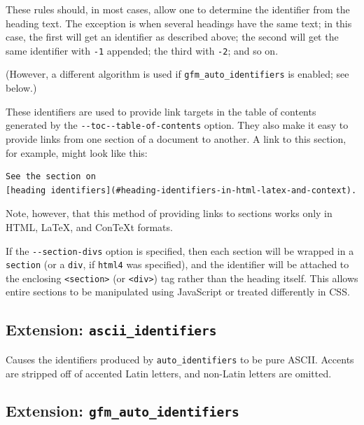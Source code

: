 \documentclass[
  b5paper
]{book}
\begin{document}
These rules should, in most cases, allow one to determine the identifier
from the heading text. The exception is when several headings have the
same text; in this case, the first will get an identifier as described
above; the second will get the same identifier with \texttt{-1}
appended; the third with \texttt{-2}; and so on.

(However, a different algorithm is used if
\texttt{gfm\_auto\_identifiers} is enabled; see below.)

These identifiers are used to provide link targets in the table of
contents generated by the
\texttt{-\/-toc\textbar{}-\/-table-of-contents} option. They also make
it easy to provide links from one section of a document to another. A
link to this section, for example, might look like this:

\begin{verbatim}
See the section on
[heading identifiers](#heading-identifiers-in-html-latex-and-context).
\end{verbatim}

Note, however, that this method of providing links to sections works
only in HTML, LaTeX, and ConTeXt formats.

If the \texttt{-\/-section-divs} option is specified, then each section
will be wrapped in a \texttt{section} (or a \texttt{div}, if
\texttt{html4} was specified), and the identifier will be attached to
the enclosing \texttt{\textless{}section\textgreater{}} (or
\texttt{\textless{}div\textgreater{}}) tag rather than the heading
itself. This allows entire sections to be manipulated using JavaScript
or treated differently in CSS.

\subsection{\texorpdfstring{Extension:
\texttt{ascii\_identifiers}}{Extension: ascii\_identifiers}}\label{extension-ascii_identifiers}

Causes the identifiers produced by \texttt{auto\_identifiers} to be pure
ASCII. Accents are stripped off of accented Latin letters, and non-Latin
letters are omitted.

\subsection{\texorpdfstring{Extension:
\texttt{gfm\_auto\_identifiers}}{Extension: gfm\_auto\_identifiers}}\label{extension-gfm_auto_identifiers}
\end{document}

